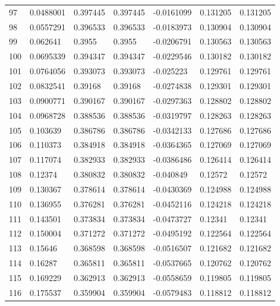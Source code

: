 \begin{longtable}{l|lll|lll}
  97 &  0.0488001   & 0.397445    & 0.397445    & -0.0161099   & 0.131205    & 0.131205    \\
  98 &  0.0557291   & 0.396533    & 0.396533    & -0.0183973   & 0.130904    & 0.130904    \\
  99 &  0.062641    & 0.3955      & 0.3955      & -0.0206791   & 0.130563    & 0.130563    \\
 100 &  0.0695339   & 0.394347    & 0.394347    & -0.0229546   & 0.130182    & 0.130182    \\
 101 &  0.0764056   & 0.393073    & 0.393073    & -0.025223    & 0.129761    & 0.129761    \\
 102 &  0.0832541   & 0.39168     & 0.39168     & -0.0274838   & 0.129301    & 0.129301    \\
 103 &  0.0900771   & 0.390167    & 0.390167    & -0.0297363   & 0.128802    & 0.128802    \\
 104 &  0.0968728   & 0.388536    & 0.388536    & -0.0319797   & 0.128263    & 0.128263    \\
 105 &  0.103639    & 0.386786    & 0.386786    & -0.0342133   & 0.127686    & 0.127686    \\
 106 &  0.110373    & 0.384918    & 0.384918    & -0.0364365   & 0.127069    & 0.127069    \\
 107 &  0.117074    & 0.382933    & 0.382933    & -0.0386486   & 0.126414    & 0.126414    \\
 108 &  0.12374     & 0.380832    & 0.380832    & -0.040849    & 0.12572     & 0.12572     \\
 109 &  0.130367    & 0.378614    & 0.378614    & -0.0430369   & 0.124988    & 0.124988    \\
 110 &  0.136955    & 0.376281    & 0.376281    & -0.0452116   & 0.124218    & 0.124218    \\
 111 &  0.143501    & 0.373834    & 0.373834    & -0.0473727   & 0.12341     & 0.12341     \\
 112 &  0.150004    & 0.371272    & 0.371272    & -0.0495192   & 0.122564    & 0.122564    \\
 113 &  0.15646     & 0.368598    & 0.368598    & -0.0516507   & 0.121682    & 0.121682    \\
 114 &  0.16287     & 0.365811    & 0.365811    & -0.0537665   & 0.120762    & 0.120762    \\
 115 &  0.169229    & 0.362913    & 0.362913    & -0.0558659   & 0.119805    & 0.119805    \\
 116 &  0.175537    & 0.359904    & 0.359904    & -0.0579483   & 0.118812    & 0.118812    \\

\end{longtable}

